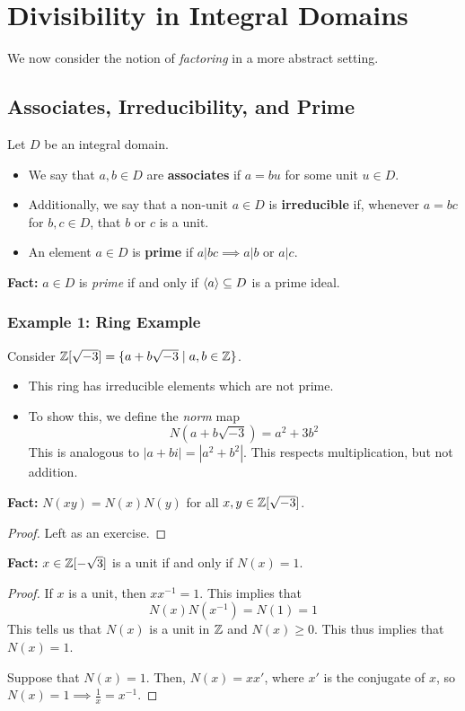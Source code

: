 \documentclass[letterpaper]{article}
\begin{document}
\section{Divisibility in Integral Domains}
We now consider the notion of \emph{factoring} in a more abstract setting. 

\subsection{Associates, Irreducibility, and Prime}
\begin{definition}{}{}
    Let $D$ be an integral domain. 
    \begin{itemize}
        \item We say that $a, b \in D$ are \textbf{associates} if $a = bu$ for some unit $u \in D$. 
        \item Additionally, we say that a non-unit $a \in D$ is \textbf{irreducible} if, whenever $a = bc$ for $b, c \in D$, that $b$ or $c$ is a unit. 
        \item An element $a \in D$ is \textbf{prime} if $a | bc \implies a | b$ or $a | c$. 
    \end{itemize}
\end{definition}
\textbf{Fact:} $a \in D$ is \emph{prime} if and only if $\langle a \rangle \subseteq D$ is a prime ideal. 

\subsubsection{Example 1: Ring Example}
Consider $\mathbb{Z}[\sqrt{-3}] = \{a + b\sqrt{-3} \mid a, b \in \mathbb{Z}\}$. 
\begin{itemize}
    \item This ring has irreducible elements which are not prime. 
    \item To show this, we define the \emph{norm} map  
    \[N(a + b\sqrt{-3}) = a^2 + 3b^2\]
    This is analogous to $|a + bi| = |a^2 + b^2|$. This respects multiplication, but not addition. 
\end{itemize}
\textbf{Fact:} $N(xy) = N(x)N(y)$ for all $x, y \in \mathbb{Z}[\sqrt{-3}]$.
\begin{mdframed}[]
    \begin{proof}
        Left as an exercise. 
    \end{proof}
\end{mdframed}
\textbf{Fact:} $x \in \mathbb{Z}[-\sqrt{3}]$ is a unit if and only if $N(x) = 1$. 
\begin{mdframed}[]
    \begin{proof}
        If $x$ is a unit, then $xx^{-1} = 1$. This implies that 
        \[N(x)N(x^{-1}) = N(1) = 1\]
        This tells us that $N(x)$ is a unit in $\mathbb{Z}$ and $N(x) \geq 0$. This thus implies that $N(x) = 1$. 

        \bigskip 

        Suppose that $N(x) = 1$. Then, $N(x) = x x'$, where $x'$ is the conjugate of $x$, so $N(x) = 1 \implies \frac{1}{x} = x^{-1}$. 
    \end{proof}
\end{mdframed}
\end{document}
